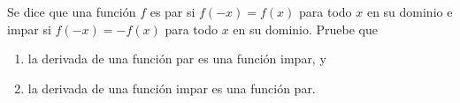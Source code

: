 \item Se dice que una función $f$ es par si $f(-x) = f(x)$ para todo $x$ en su dominio e impar si $f(-x) = -f(x)$ para todo $x$ en su dominio. Pruebe que
    \begin{enumerate}
        \item la derivada de una función par es una función impar, y
        \item la derivada de una función impar es una función par.
    \end{enumerate}
